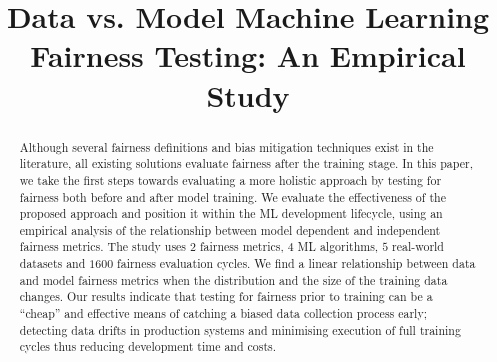 \documentclass[conference,review,anonymous]{IEEEtran}
\begin{document}
\title{Data vs. Model Machine Learning Fairness Testing: An Empirical Study}


\author{
\and
{}
\and
{}
}


\maketitle

\begin{abstract}

  Although several fairness definitions and bias mitigation techniques
  exist in the literature, all existing solutions evaluate fairness
  after the training stage. In this paper, we take the first steps
  towards evaluating a more holistic approach by testing for fairness
  both before and after model training. We evaluate the effectiveness
  of the proposed approach and position it within the ML development
  lifecycle, using an empirical analysis of the relationship between
  model dependent and independent fairness metrics. The study uses $2$
  fairness metrics, $4$ ML algorithms, $5$ real-world datasets and
  $1600$ fairness evaluation cycles. We find a linear relationship
  between data and model fairness metrics when the distribution and
  the size of the training data changes. Our results indicate that
  testing for fairness prior to training can be a ``cheap'' and
  effective means of catching a biased data collection process early;
  detecting data drifts in production systems and minimising execution
  of full training cycles thus reducing development time and costs.

\end{abstract}
\end{document}

